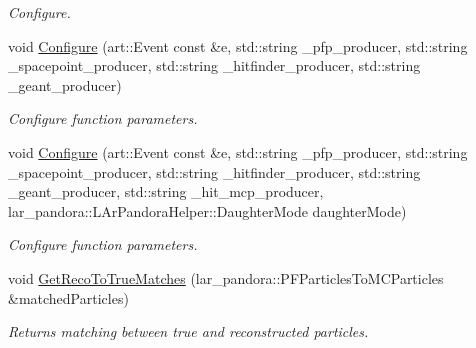 \begin{DoxyCompactItemize}
\begin{DoxyCompactList}\small\item\em Configure. \end{DoxyCompactList}\item 
void \hyperlink{classubana_1_1McPfpMatch_a0f07649a58ade64a2a127846231cd7c8}{Configure} (art\-::\-Event const \&e, std\-::string \-\_\-pfp\-\_\-producer, std\-::string \-\_\-spacepoint\-\_\-producer, std\-::string \-\_\-hitfinder\-\_\-producer, std\-::string \-\_\-geant\-\_\-producer)
\begin{DoxyCompactList}\small\item\em Configure function parameters. \end{DoxyCompactList}\item 
void \hyperlink{classubana_1_1McPfpMatch_af0f60c86d087ee5c99a73170cf03b200}{Configure} (art\-::\-Event const \&e, std\-::string \-\_\-pfp\-\_\-producer, std\-::string \-\_\-spacepoint\-\_\-producer, std\-::string \-\_\-hitfinder\-\_\-producer, std\-::string \-\_\-geant\-\_\-producer, std\-::string \-\_\-hit\-\_\-mcp\-\_\-producer, lar\-\_\-pandora\-::\-L\-Ar\-Pandora\-Helper\-::\-Daughter\-Mode daughter\-Mode)
\begin{DoxyCompactList}\small\item\em Configure function parameters. \end{DoxyCompactList}\item 
void \hyperlink{classubana_1_1McPfpMatch_a44436a82315246fb67b42f8542fb327c}{Get\-Reco\-To\-True\-Matches} (lar\-\_\-pandora\-::\-P\-F\-Particles\-To\-M\-C\-Particles \&matched\-Particles)
\begin{DoxyCompactList}\small\item\em Returns matching between true and reconstructed particles. \end{DoxyCompactList}\end{DoxyCompactItemize}
